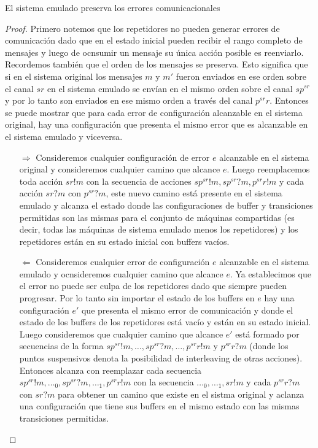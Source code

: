 \begin{prop} El sistema emulado preserva los errores comunicacionales

\begin{proof} Primero notemos que los repetidores no pueden generar errores de comunicación dado que en el estado inicial pueden recibir el rango completo de mensajes y luego de ocnsumir un mensaje su única acción posible es reenviarlo. Recordemos también que el orden de los mensajes se preserva. Esto significa que si en el sistema original los mensajes $ m $ y $m'$ fueron enviados en ese orden sobre el canal $sr$ en el sistema emulado se envían en el mismo orden sobre el canal $sp^{sr}$ y por lo tanto son enviados en ese mismo orden a través del canal $p^{sr}r$. Entonces se puede mostrar que para cada error de configuración alcanzable en el sistema original, hay una configuración que presenta el mismo error que es alcanzable en el sistema emulado y viceversa.
\begin{itemize}
\item[$\Rightarrow$] Consideremos cualquier configuración de error $e$ alcanzable en el sistema original y consideremos cualquier camino que alcance $e$. Luego reemplacemos toda acción $sr!m$ con la secuencia de acciones $sp^{sr}!m, sp^{sr}?m, p^{sr}r!m$ y cada acción $sr?m$ con $p^{sr}?m$, este nuevo camino está presente en el sistema emulado y alcanza el estado donde las configuraciones de buffer y transiciones permitidas son las mismas para el conjunto de máquinas compartidas (es decir, todas las máquinas de sistema emulado menos los repetidores) y los repetidores están en su estado inicial con buffers vacíos.
\item[$\Leftarrow$] Consideremos cualquier error de configuración $e$ alcanzable en el sistema emulado y ocnsideremos cualquier camino que alcance $e$. Ya establecimos que el error no puede ser culpa de los repetidores dado que siempre pueden progresar. Por lo tanto sin importar el estado de los buffers en $e$ hay una configuración $e'$ que presenta el mismo error de comunicación y donde el estado de los buffers de los repetidores está vacío y están en su estado inicial. Luego consideremos que cualquier camino que alcance $e'$ está formado por secuencias de la forma $sp^{sr}!m,\ldots, sp^{sr}?m, \ldots, p^{sr}r!m$ y $p^{sr}r?m$ (donde los puntos suspensivos denota la posibilidad de interleaving de otras acciones). Entonces alcanza con reemplazar cada secuencia $sp^{sr}!m,\ldots_0, sp^{sr}?m, \ldots_1, p^{sr}r!m$ con la secuencia $\ldots_0,\ldots_1, sr!m$ y cada $p^{sr}r?m$ con $sr?m$ para obtener un camino que existe en el sistma original y aclanza una configuración que tiene sus buffers en el mismo estado con las mismas transiciones permitidas.
\end{itemize}
\end{proof}
\end{prop}
